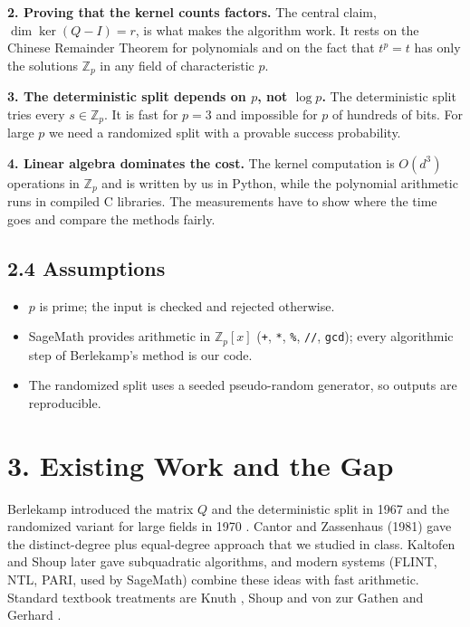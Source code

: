 \documentclass[11pt,a4paper]{article}
\newcommand{\Zp}{\mathbb{Z}_p}
\newcommand{\Zpx}{\mathbb{Z}_p[x]}
\begin{document}
\textbf{2. Proving that the kernel counts factors.}
The central claim, $\dim \ker(Q - I) = r$, is what makes the algorithm work. It rests on the
Chinese Remainder Theorem for polynomials and on the fact that $t^p = t$ has only the solutions
$\Zp$ in any field of characteristic $p$.

\textbf{3. The deterministic split depends on $p$, not $\log p$.}
The deterministic split tries every $s \in \Zp$. It is fast for $p = 3$ and impossible for $p$ of
hundreds of bits. For large $p$ we need a randomized split with a provable success probability.

\textbf{4. Linear algebra dominates the cost.}
The kernel computation is $O(d^3)$ operations in $\Zp$ and is written by us in Python, while
the polynomial arithmetic runs in compiled C libraries. The measurements have to show where the
time goes and compare the methods fairly.

\subsection*{2.4 Assumptions}

\begin{itemize}
    \item $p$ is prime; the input is checked and rejected otherwise.
    \item SageMath provides arithmetic in $\Zpx$ (\texttt{+}, \texttt{*}, \texttt{\%}, \texttt{//}, \texttt{gcd}); every algorithmic step of Berlekamp's method is our code.
    \item The randomized split uses a seeded pseudo-random generator, so outputs are reproducible.
\end{itemize}

\section*{3. Existing Work and the Gap}

Berlekamp introduced the matrix $Q$ and the deterministic split in 1967 \cite{berlekamp67} and
the randomized variant for large fields in 1970 \cite{berlekamp70}. Cantor and Zassenhaus (1981)
\cite{cantorzassenhaus} gave the distinct-degree plus equal-degree approach that we studied in
class. Kaltofen and Shoup \cite{kaltofenshoup} later gave subquadratic algorithms, and modern
systems (FLINT, NTL, PARI, used by SageMath) combine these ideas with fast arithmetic. Standard
textbook treatments are Knuth \cite{knuth}, Shoup \cite{shoup} and von zur Gathen and Gerhard
\cite{mca}.
\end{document}
